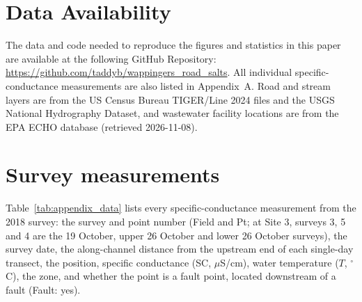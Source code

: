 \documentclass{article}
\begin{document}
\section*{Data Availability}

The data and code needed to reproduce the figures and statistics in this paper are available at the following GitHub Repository: \url{https://github.com/taddyb/wappingers_road_salts}. All individual specific-conductance measurements are also listed in Appendix~A. Road and stream layers are from the US Census Bureau TIGER/Line 2024 files and the USGS National Hydrography Dataset, and wastewater facility locations are from the EPA ECHO database (retrieved 2026-11-08).





\appendix
\renewcommand{\thetable}{A\arabic{table}}
\setcounter{table}{0}
\renewcommand{\theHtable}{A\arabic{table}}

\section{Survey measurements}

Table~\ref{tab:appendix_data} lists every specific-conductance measurement from the 2018 survey: the survey and point number (Field and Pt; at Site 3, surveys 3, 5 and 4 are the 19 October, upper 26 October and lower 26 October surveys), the survey date, the along-channel distance from the upstream end of each single-day transect, the position, specific conductance (SC, $\mu$S/cm), water temperature ($T$, $^{\circ}$C), the zone, and whether the point is a fault point, located downstream of a fault (Fault: yes).


\end{document}
